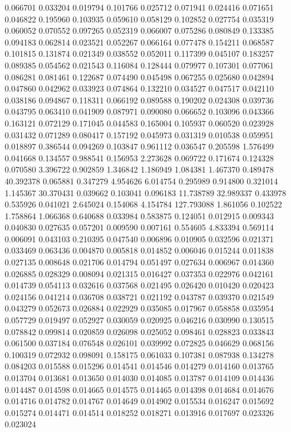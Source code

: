 0.066701
0.033204
0.019794
0.101766
0.025712
0.071941
0.024416
0.071651
0.046822
0.195960
0.103935
0.059610
0.058129
0.102852
0.027754
0.035319
0.060052
0.070552
0.097265
0.052319
0.066007
0.075286
0.080849
0.133385
0.094183
0.062814
0.023521
0.052267
0.066164
0.077478
0.154211
0.068587
0.101815
0.131874
0.021349
0.038552
0.052011
0.117399
0.045107
0.183257
0.089385
0.054562
0.021543
0.116084
0.128444
0.079977
0.107301
0.077061
0.086281
0.081461
0.122687
0.074490
0.045498
0.067255
0.025680
0.042894
0.047860
0.042962
0.033923
0.074864
0.132210
0.034527
0.047517
0.042110
0.038186
0.094867
0.118311
0.066192
0.089588
0.190202
0.024308
0.039736
0.043795
0.063410
0.041909
0.087971
0.090080
0.066652
0.103096
0.043366
0.163121
0.072129
0.171045
0.044583
0.165004
0.105937
0.060520
0.023928
0.031432
0.071289
0.080417
0.157192
0.045973
0.031319
0.010538
0.059951
0.018897
0.386544
0.094269
0.103847
0.961112
0.036547
0.205598
1.576499
0.041668
0.134557
0.988541
0.156953
2.273628
0.069722
0.171674
0.124328
0.070580
3.396722
0.902859
1.346842
1.186949
1.084381
1.467370
0.489478
40.392378
0.065881
0.347279
4.954626
6.014754
0.295989
0.914800
0.321014
1.145367
30.370431
0.039662
0.103041
0.096183
11.738789
32.989337
0.433978
0.535926
0.041021
2.645024
0.154068
4.154784
127.793088
1.861056
0.102522
1.758864
1.066368
0.640688
0.033984
0.583875
0.124051
0.012915
0.009343
0.040830
0.027635
0.057201
0.009590
0.007161
0.554605
4.833394
0.569114
0.006091
0.043103
0.210395
0.047540
0.006896
0.010905
0.032596
0.021371
0.033469
0.063436
0.004870
0.005818
0.014852
0.006046
0.015244
0.011838
0.027135
0.008648
0.021706
0.014794
0.051497
0.027634
0.006967
0.014360
0.026885
0.028329
0.008094
0.021315
0.016427
0.037353
0.022976
0.042161
0.014739
0.054113
0.032616
0.037568
0.021495
0.026420
0.010420
0.020423
0.024156
0.041214
0.036708
0.038721
0.021192
0.043787
0.039370
0.021549
0.043279
0.052673
0.026884
0.022929
0.035085
0.017967
0.058858
0.035954
0.057729
0.019497
0.052927
0.030059
0.020925
0.046216
0.030990
0.130515
0.078842
0.099814
0.020859
0.026098
0.025052
0.098461
0.028823
0.033843
0.061500
0.037184
0.076548
0.026101
0.039992
0.072825
0.046629
0.068156
0.100319
0.072932
0.098091
0.158175
0.061033
0.107381
0.087938
0.134278
0.084203
0.015588
0.015296
0.014541
0.014546
0.014279
0.014160
0.013765
0.013704
0.013681
0.013650
0.014030
0.014085
0.013787
0.014109
0.014436
0.014487
0.014598
0.014665
0.014575
0.014465
0.014398
0.014684
0.014676
0.014716
0.014782
0.014767
0.014649
0.014902
0.015534
0.016247
0.015692
0.015274
0.014471
0.014514
0.018252
0.018271
0.013916
0.017697
0.023326
0.023024
